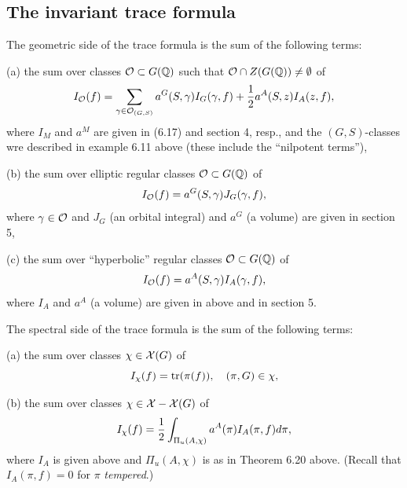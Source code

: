 \subsection{The invariant trace formula}

The geometric side of the trace formula is the sum of the following terms:

(a) the sum over classes ${\cal{O}}\subset G({\Bbb{Q}})$
such that ${\cal{O}}\cap Z(G({\Bbb{Q}}))\not= \emptyset$ of
\begin{equation}
I_{\cal{O}}(f)=\sum_{\gamma\in {\cal{O}}_{(G,S)}}
a^G(S,\gamma)I_G(\gamma,f)+{1\over 2}a^A(S,z)I_A(z,f),
\end{equation}
where $I_M$ and $a^M$ are given in (6.17) and section 4,
resp., and the $(G,S)$-classes wre described in example 6.11
above (these include the ``nilpotent terms''),

(b) the sum over elliptic regular classes 
${\cal{O}}\subset G({\Bbb{Q}})$
of
\begin{equation}
I_{\cal{O}}(f)=
a^G(S,\gamma)J_G(\gamma,f),
\end{equation}
where $\gamma\in {\cal{O}}$ and
$J_G$ (an orbital integral) and $a^G$ (a volume)
are given in section 5,

(c) the sum over ``hyperbolic'' regular classes
${\cal{O}}\subset G({\Bbb{Q}})$
of
\begin{equation}
I_{\cal{O}}(f)=
a^A(S,\gamma)I_A(\gamma,f),
\end{equation}
where $I_A$ and $a^A$ (a volume)
are given in above and in section 5.

The spectral side of the trace formula is the sum of the following terms:

(a) the sum over classes $\chi\in {\cal{X}}(G)$ of
\begin{equation}
I_\chi(f)=
{\rm tr}(\pi(f)),\ \ \ (\pi,G)\in\chi,
\end{equation}

(b) the sum over classes $\chi\in {\cal{X}}-{\cal{X}}(G)$ of
\begin{equation}
I_\chi(f)=
{1\over 2}\int_{\Pi_u(A,\chi)}
a^A(\pi)I_A(\pi,f)d\pi,
\end{equation}
where $I_A$ is given above and $\Pi_u(A,\chi)$ is as in Theorem 6.20
above. (Recall that $I_A(\pi,f)=0$ for $\pi$ {\em tempered}.)



